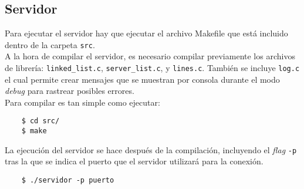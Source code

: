 \subsection{Servidor}

Para ejecutar el servidor hay que ejecutar el archivo Makefile que está incluido dentro de la carpeta \texttt{src}.\\

A la hora de compilar el servidor, es necesario compilar previamente los archivos de
librería: \texttt{linked\_list.c}, \texttt{server\_list.c}, y \texttt{lines.c}. También se incluye \texttt{log.c} el cual permite crear mensajes que se muestran por consola durante el modo \textit{debug} para rastrear posibles errores.\\

Para compilar es tan simple como ejecutar:
\begin{lstlisting}
    $ cd src/
    $ make
\end{lstlisting}

La ejecución del servidor se hace después de la compilación, incluyendo el \textit{flag} \texttt{-p} tras la que se indica el puerto que el servidor utilizará para la conexión.
\begin{lstlisting}
    $ ./servidor -p puerto
\end{lstlisting}